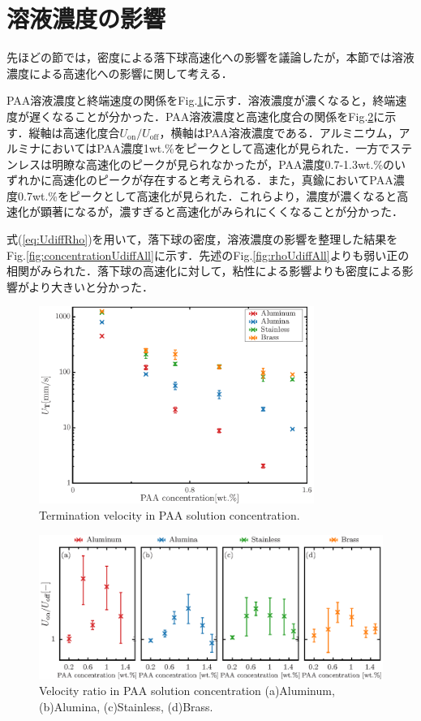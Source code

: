 \section{溶液濃度の影響}

先ほどの節では，密度による落下球高速化への影響を議論したが，本節では溶液濃度による高速化への影響に関して考える．

PAA溶液濃度と終端速度の関係をFig.\ref{fig:concentrationUT}に示す．溶液濃度が濃くなると，終端速度が遅くなることが分かった．PAA溶液濃度と高速化度合の関係をFig.\ref{fig:concentrationUdiff}に示す．縦軸は高速化度合$U_\text{on}/U_\text{off}$，横軸はPAA溶液濃度である．アルミニウム，アルミナにおいてはPAA濃度1wt.\%をピークとして高速化が見られた．一方でステンレスは明瞭な高速化のピークが見られなかったが，PAA濃度0.7-1.3wt.\%のいずれかに高速化のピークが存在すると考えられる．また，真鍮においてPAA濃度0.7wt.\%をピークとして高速化が見られた．これらより，濃度が濃くなると高速化が顕著になるが，濃すぎると高速化がみられにくくなることが分かった．

式(\ref{eq:UdiffRho})を用いて，落下球の密度，溶液濃度の影響を整理した結果をFig.\ref{fig:concentrationUdiffAll}に示す．先述のFig.\ref{fig:rhoUdiffAll}よりも弱い正の相関がみられた．落下球の高速化に対して，粘性による影響よりも密度による影響がより大きいと分かった．

\begin{figure}[ht]
    \centering
    \includegraphics[width=0.8\textwidth]{./5-Results/concentrationUT.eps}
    \caption{Termination velocity in PAA solution concentration.}
    \label{fig:concentrationUT}
\end{figure}

\begin{figure}[ht]
    \centering
    \includegraphics[width=1.0\textwidth]{./5-Results/concentrationUdiff.eps}
    \caption{Velocity ratio in PAA solution concentration (a)Aluminum, (b)Alumina, (c)Stainless, (d)Brass.}
    \label{fig:concentrationUdiff}
\end{figure}

